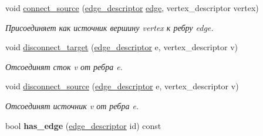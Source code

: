 \begin{DoxyCompactItemize}
\mbox{\label{class_s_p_u___g_r_a_p_h_1_1_spu_ultra_graph_a6b97dbd065c11d5b8481ca95f04b3dde}} 
void \hyperlink{class_s_p_u___g_r_a_p_h_1_1_spu_ultra_graph_a6b97dbd065c11d5b8481ca95f04b3dde}{connect\+\_\+source} (\hyperlink{class_s_p_u___g_r_a_p_h_1_1_spu_ultra_graph_a5f3776e003ef0a1648f1d9f84289810b}{edge\+\_\+descriptor} \hyperlink{class_s_p_u___g_r_a_p_h_1_1_spu_ultra_graph_a51468aa2278d3abb0c338ffbeac7747a}{edge}, vertex\+\_\+descriptor vertex)
\begin{DoxyCompactList}\small\item\em Присоединяет как источник вершину vertex к ребру edge. \end{DoxyCompactList}\item 
\mbox{\label{class_s_p_u___g_r_a_p_h_1_1_spu_ultra_graph_af899cd98f90a3a278cd65218799cf0d3}} 
void \hyperlink{class_s_p_u___g_r_a_p_h_1_1_spu_ultra_graph_af899cd98f90a3a278cd65218799cf0d3}{disconnect\+\_\+target} (\hyperlink{class_s_p_u___g_r_a_p_h_1_1_spu_ultra_graph_a5f3776e003ef0a1648f1d9f84289810b}{edge\+\_\+descriptor} e, vertex\+\_\+descriptor v)
\begin{DoxyCompactList}\small\item\em Отсоединят сток v от ребра e. \end{DoxyCompactList}\item 
\mbox{\label{class_s_p_u___g_r_a_p_h_1_1_spu_ultra_graph_a3b86fa8167681fc4db901a542cf5db3c}} 
void \hyperlink{class_s_p_u___g_r_a_p_h_1_1_spu_ultra_graph_a3b86fa8167681fc4db901a542cf5db3c}{disconnect\+\_\+source} (\hyperlink{class_s_p_u___g_r_a_p_h_1_1_spu_ultra_graph_a5f3776e003ef0a1648f1d9f84289810b}{edge\+\_\+descriptor} e, vertex\+\_\+descriptor v)
\begin{DoxyCompactList}\small\item\em Отсоединят источник v от ребра e. \end{DoxyCompactList}\item 
\mbox{\label{class_s_p_u___g_r_a_p_h_1_1_spu_ultra_graph_a19a04e44979bf73fb3cb8c84d4ba80f2}} 
bool {\bfseries has\+\_\+edge} (\hyperlink{class_s_p_u___g_r_a_p_h_1_1_spu_ultra_graph_a5f3776e003ef0a1648f1d9f84289810b}{edge\+\_\+descriptor} id) const
\item 

\end{DoxyCompactItemize}
